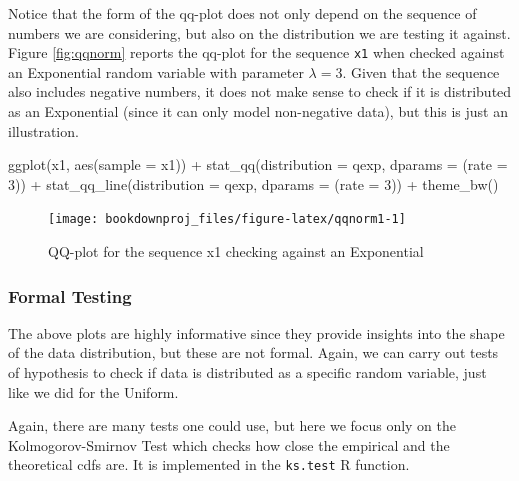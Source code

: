 \documentclass[
]{book}
\newenvironment{Shaded}{\begin{snugshade}}{\end{snugshade}}
\newcommand{\AttributeTok}[1]{\textcolor[rgb]{0.77,0.63,0.00}{#1}}
\newcommand{\DecValTok}[1]{\textcolor[rgb]{0.00,0.00,0.81}{#1}}
\newcommand{\FunctionTok}[1]{\textcolor[rgb]{0.00,0.00,0.00}{#1}}
\newcommand{\NormalTok}[1]{#1}
\newcommand{\SpecialCharTok}[1]{\textcolor[rgb]{0.00,0.00,0.00}{#1}}
\begin{document}
Notice that the form of the qq-plot does not only depend on the sequence of numbers we are considering, but also on the distribution we are testing it against. Figure \ref{fig:qqnorm} reports the qq-plot for the sequence \texttt{x1} when checked against an Exponential random variable with parameter \(\lambda =3\). Given that the sequence also includes negative numbers, it does not make sense to check if it is distributed as an Exponential (since it can only model non-negative data), but this is just an illustration.

\begin{Shaded}
\begin{Highlighting}[]
\FunctionTok{ggplot}\NormalTok{(x1, }\FunctionTok{aes}\NormalTok{(}\AttributeTok{sample =}\NormalTok{ x1)) }\SpecialCharTok{+}
   \FunctionTok{stat\_qq}\NormalTok{(}\AttributeTok{distribution =}\NormalTok{ qexp, }\AttributeTok{dparams =}\NormalTok{ (}\AttributeTok{rate =} \DecValTok{3}\NormalTok{)) }\SpecialCharTok{+}
   \FunctionTok{stat\_qq\_line}\NormalTok{(}\AttributeTok{distribution =}\NormalTok{ qexp, }\AttributeTok{dparams =}\NormalTok{ (}\AttributeTok{rate =} \DecValTok{3}\NormalTok{)) }\SpecialCharTok{+}
   \FunctionTok{theme\_bw}\NormalTok{()}
\end{Highlighting}
\end{Shaded}

\begin{figure}

{\centering \texttt{[image: bookdownproj\_files/figure-latex/qqnorm1-1]} 

}

\caption{QQ-plot for the sequence x1 checking against an Exponential}\label{fig:qqnorm1}
\end{figure}

\hypertarget{formal-testing}{%
\subsubsection{Formal Testing}\label{formal-testing}}

The above plots are highly informative since they provide insights into the shape of the data distribution, but these are not formal. Again, we can carry out tests of hypothesis to check if data is distributed as a specific random variable, just like we did for the Uniform.

Again, there are many tests one could use, but here we focus only on the Kolmogorov-Smirnov Test which checks how close the empirical and the theoretical cdfs are. It is implemented in the \texttt{ks.test} R function.
\end{document}
